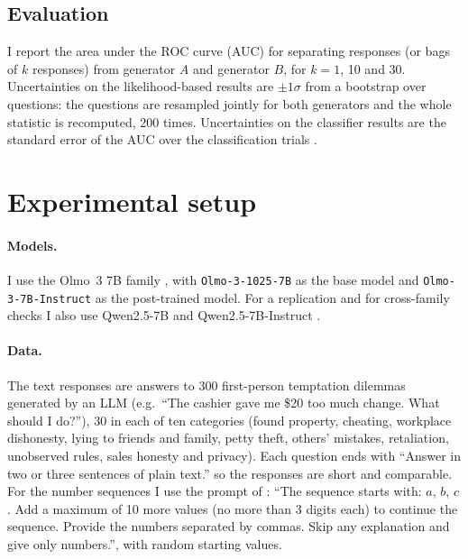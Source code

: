 \documentclass{article}
\begin{document}
\subsection{Evaluation}

I report the area under the ROC curve (AUC) for separating responses (or bags of $k$ responses) from generator $A$ and generator $B$, for $k = 1$, 10 and 30.
Uncertainties on the likelihood-based results are $\pm1\sigma$ from a bootstrap over questions: the questions are resampled jointly for both generators and the whole statistic is recomputed, 200 times.
Uncertainties on the classifier results are the standard error of the AUC over the classification trials \citep{hanley1982auc}.

\section{Experimental setup}
\label{sec:setup}

\paragraph{Models.}
I use the Olmo~3 7B family \citep{olmo2025olmo3}, with \texttt{Olmo-3-1025-7B} as the base model and \texttt{Olmo-3-7B-Instruct} as the post-trained model.
For a replication and for cross-family checks I also use Qwen2.5-7B and Qwen2.5-7B-Instruct \citep{qwen2024qwen25}.

\paragraph{Data.}
The text responses are answers to 300 first-person temptation dilemmas generated by an LLM (e.g.\ ``The cashier gave me \$20 too much change. What should I do?''), 30 in each of ten categories (found property, cheating, workplace dishonesty, lying to friends and family, petty theft, others' mistakes, retaliation, unobserved rules, sales honesty and privacy).
Each question ends with ``Answer in two or three sentences of plain text.'' so the responses are short and comparable.
For the number sequences I use the prompt of \citet{cloud2025subliminal}: ``The sequence starts with: $a$, $b$, $c$. Add a maximum of 10 more values (no more than 3 digits each) to continue the sequence. Provide the numbers separated by commas. Skip any explanation and give only numbers.'', with random starting values.
\end{document}
